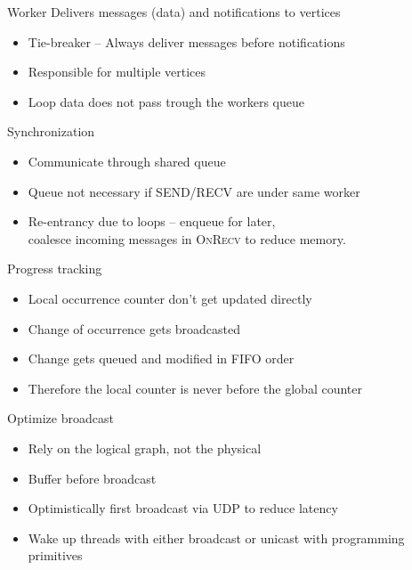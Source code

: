 \begin{frame}[t]{Worker}
  \vspace{0.15cm}
  Delivers messages (data) and notifications to vertices

  \begin{itemize}\setlength\itemsep{0.25cm}
    \item Tie-breaker -- Always deliver messages before notifications
    \item Responsible for multiple vertices
    \item Loop data does not pass trough the workers queue
  \end{itemize}

  \pause
  \vspace{0.25cm}
  Synchronization
  \begin{itemize}\setlength\itemsep{0.25cm}
    \item Communicate through shared queue
    \item Queue not necessary if \textsc{SEND/RECV} are under same worker
    \item Re-entrancy due to loops -- enqueue for later, \\
          coalesce incoming messages in \textsc{OnRecv} to reduce memory.
  \end{itemize}

\end{frame}

\begin{frame}[t]{Progress tracking}
\vspace{0.15cm}
  \begin{itemize}\setlength\itemsep{0.25cm}
     \item Local occurrence counter don't get updated directly
     \item Change of occurrence gets broadcasted
     \item Change gets queued and modified in FIFO order
     \item Therefore the local counter is never before the global counter
   \end{itemize}
\pause

  \vspace{0.25cm}
  Optimize broadcast
   \begin{itemize}\setlength\itemsep{0.25cm}
     \item Rely on the logical graph, not the physical
     \item Buffer before broadcast
     \item Optimistically first broadcast via UDP to reduce latency
     \item Wake up threads with either broadcast or unicast with programming primitives
   \end{itemize}

\end{frame}

